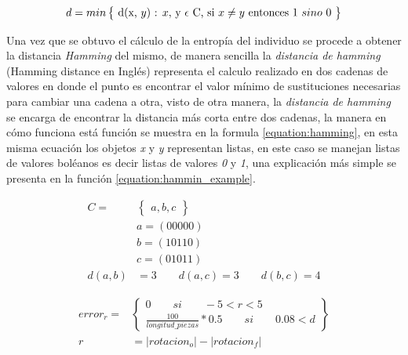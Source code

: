 \begin{equation}
d = min \begin{Bmatrix} $ d(x, $ y)$ : $ x, $ y $ \epsilon $ C, si $ x \neq y $ entonces 1 $ sino $ 0 $ \end{Bmatrix}
\label{equation:hamming}
\end{equation}

Una vez que se obtuvo el cálculo de la entropía del individuo se procede a
obtener la distancia \textit{Hamming} del mismo, de manera sencilla la
\textit{distancia de hamming} (Hamming distance en Inglés) representa el calculo
realizado en dos cadenas de valores en donde el punto es encontrar el valor
mínimo de sustituciones necesarias para cambiar una cadena a otra, visto de otra
manera, la \textit{distancia de hamming} se encarga de encontrar la distancia
más corta entre dos cadenas, la manera en cómo funciona está función se muestra
en la formula \ref{equation:hamming}, en esta misma ecuación los objetos
\textit{x} y \textit{y} representan listas, en este caso se manejan listas de
valores boléanos es decir listas de valores \textit{0} y \textit{1}, una
explicación más simple se presenta en la función \ref{equation:hammin_example}.

\begin{equation}
  \begin{split}
    C = & \begin{Bmatrix} a, b, c \end{Bmatrix} \\
     & a = (00000) \\
     & b = (10110) \\
     & c = (01011) \\
     d(a, b) & = 3 \qquad d(a, c) = 3 \qquad d(b, c) = 4
  \end{split}
  \label{equation:hammin_example}
\end{equation}

\begin{equation}
  \begin{split}
    error_{r} = & 
    \begin{Bmatrix}
      0 \qquad si \qquad -5 < r < 5 \\ 
      \frac{100}{longitud\_piezas} * 0.5 \qquad si \qquad 0.08 < d
    \end{Bmatrix} \\
     r & = \left | rotacion_o \right | - \left | rotacion_f \right |
  \end{split}
  \label{equation:error_ang}
\end{equation}

